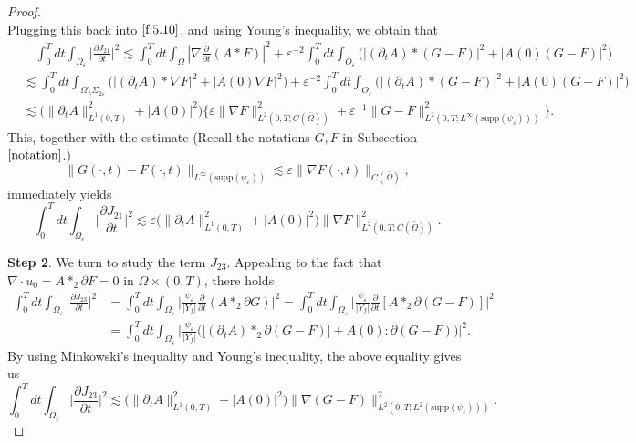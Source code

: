 \documentclass[13pt,CJK]{article}
\theoremstyle{plain}                       %
\theoremstyle{remark}
\numberwithin{equation}{section}
\begin{document}
\begin{proof}
\begin{equation*}
\end{equation*}
Plugging this back into $\eqref{f:5.10}$, and using
Young's inequality,  we obtain that
\begin{equation*}
\begin{aligned}
&\quad\int_{0}^{T}dt\int_{\Omega_{\varepsilon}}\Big|\frac{\partial J_{21}}{\partial t}\Big|^2
\lesssim
\int_{0}^{T}dt
\int_{\Omega}
|\nabla\frac{\partial }{\partial t}( A\ast F)|^2
+\varepsilon^{-2}
\int_{0}^{T}dt
\int_{O_{\varepsilon}}
\big(|(\partial_tA)\ast (G-F)|^2+|A(0)(G-F)|^2\big)\\
&\lesssim
\int_{0}^{T}dt\int_{\Omega\setminus\Sigma_{2\varepsilon}}
\big(|(\partial_tA)\ast \nabla F|^2+|A(0)\nabla F|^2\big)+\varepsilon^{-2}
\int_{0}^{T}dt\int_{O_{\varepsilon}}
\big(|(\partial_tA)\ast (G-F)|^2+|A(0)(G-F)|^2\big)\\
&\lesssim
\big(\|\partial_tA\|_{L^1(0,T)}^2+|A(0)|^2\big)
\Big\{\varepsilon\|\nabla F\|_{L^2(0,T;C(\bar{\Omega}))}^2
+ \varepsilon^{-1}\|G-F\|_{L^2(0,T;L^\infty(\text{supp}
(\psi_{\varepsilon})))}^2 \Big\}.
\end{aligned}
\end{equation*}
This, together with the estimate (Recall the notations $G,F$ in Subsection $\ref{notation}$.)
\begin{equation*}
\|G(\cdot,t)
-F(\cdot,t)\|_{L^\infty(\text{supp}
(\psi_{\varepsilon}))}\lesssim\varepsilon
\|\nabla F(\cdot,t)\|_{C(\bar\Omega)},
\end{equation*}
immediately yields
\begin{equation}\label{*xi2}
\int_{0}^{T}dt\int_{\Omega_{\varepsilon}}\Big|\frac{\partial J_{21}}{\partial t}\Big|^2
\lesssim \varepsilon
\big(\|\partial_tA\|_{L^1(0,T)}^2+|A(0)|^2\big)
\|\nabla F\|_{L^2(0,T;C(\bar{\Omega}))}^2.
\end{equation}


\textbf{Step 2}. We turn to study the term $J_{23}$.
Appealing to
the fact that $\nabla\cdot u_0=A\ast_2\partial F=0$ in $\Omega\times(0,T)$,
there holds
\begin{equation*}
\begin{aligned}
  \int_{0}^{T}dt\int_{\Omega_{\varepsilon}}\Big|
  \frac{\partial J_{23}}{\partial t}
  \Big|^2
  &=
  \int_{0}^{T}dt\int_{\Omega_{\varepsilon}}\Big|
  \frac{\psi_{\varepsilon}}{|Y_f|}
  \frac{\partial}{\partial t}(A\ast_2\partial G)
  \Big|^2
  =\int_{0}^{T}dt\int_{\Omega_{\varepsilon}}\Big|
  \frac{\psi_{\varepsilon}}{|Y_f|}
  \frac{\partial}{\partial t}[A\ast_2\partial (G-F)]\Big|^2\\
  &=\int_{0}^{T}dt\int_{\Omega_{\varepsilon}}\Big|
  \frac{\psi_{\varepsilon}}{|Y_f|}
  \Big(\big[(\partial_tA)\ast_2\partial (G-F)\big]
  +A(0):\partial (G-F)\Big)\Big|^2.
\end{aligned}
\end{equation*}
By using Minkowski's inequality and Young's inequality, the above equality
gives us
\begin{equation}\label{*xi3}
\int_{0}^{T}dt\int_{\Omega_{\varepsilon}}\Big|
\frac{\partial J_{23}}{\partial t}
\Big|^2\lesssim
\big(\|\partial_tA\|^2_{L^1(0,T)}+|A(0)|^2\big)
\|\nabla(G-F)\|^2_{
L^2(0,T;L^2{(\text{supp}(\psi_{\varepsilon}))})}.
\end{equation}



\end{proof}
\end{document}
